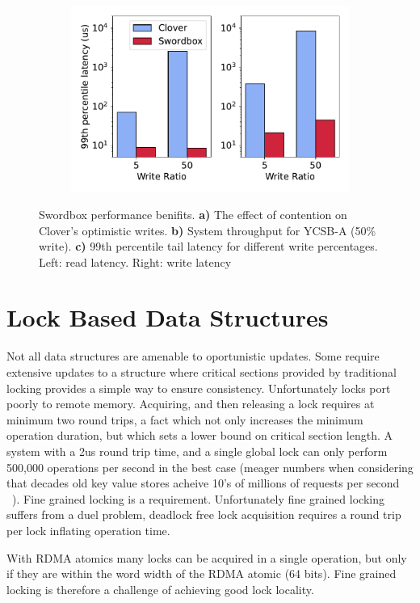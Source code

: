 \begin{figure}[t!]
\begin{subfigure}{.33\textwidth}
      \centering
      \includegraphics[width=.9\linewidth]{fig/99th_latency.pdf}
    \end{subfigure}

    \caption{Swordbox performance benifits. \textbf{a)} The effect of contention on
    Clover's optimistic writes. \textbf{b)} System throughput
    for YCSB-A (50\% write). \textbf{c)} 99th percentile tail
    latency for different write percentages. Left: read
    latency. Right: write latency}
        
    \label{fig:swordbox}
\end{figure}

\section{Lock Based Data Structures}

Not all data structures are amenable to oportunistic
updates. Some require extensive updates to a structure where
critical sections provided by traditional locking provides a
simple way to ensure consistency. Unfortunately locks port
poorly to remote memory. 
Acquiring, and then releasing a lock requires at minimum two
round trips, a fact which not only increases the minimum
operation duration, but which sets a lower bound on critical
section length. A system with a 2us round trip time, and a
single global lock can only perform 500,000 operations per
second in the best case (meager numbers when considering that
decades old key value stores acheive 10's of millions of
requests per second ~\cite{herd}). Fine grained locking is a
requirement.  Unfortunately fine grained locking suffers from
a duel problem, deadlock free lock acquisition requires a
round trip per lock inflating operation time. 

With RDMA atomics many locks can be acquired in a single
operation, but only if they are within the word width of the
RDMA atomic (64 bits). Fine grained locking is therefore a
challenge of achieving good lock locality.

